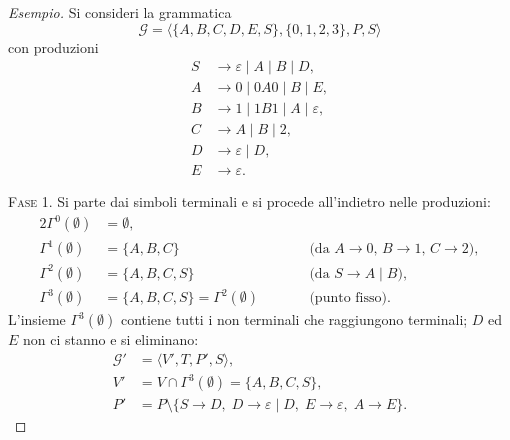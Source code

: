 \documentclass[a4paper, 11pt, oneside]{book}
\theoremstyle{formale}
\newenvironment{esempio}
    {\begin{proof}[\textit{Esempio}]\renewcommand{\qedsymbol}{$\diamond$}}
    {\end{proof}}
\begin{document}
    \begin{esempio}
        Si consideri la grammatica
        \begin{equation*}
            \mathcal{G} = \langle \{A, B, C, D, E, S\}, \{0, 1, 2, 3\}, P, S \rangle
        \end{equation*}
        con produzioni
        \begin{align*}
            S &\to \varepsilon \mid A \mid B \mid D, \\
            A &\to 0 \mid 0A0 \mid B \mid E, \\
            B &\to 1 \mid 1B1 \mid A \mid \varepsilon, \\
            C &\to A \mid B \mid 2, \\
            D &\to \varepsilon \mid D, \\
            E &\to \varepsilon.
        \end{align*}

        \textsc{Fase 1}. Si parte dai simboli terminali e si procede all'indietro nelle
        produzioni:
        \begin{alignat*}{2}
            \Gamma^0(\emptyset) &= \emptyset, & & \\
            \Gamma^1(\emptyset) &= \{A, B, C\}
                & \qquad & \text{(da $A \to 0$, $B \to 1$, $C \to 2$)}, \\
            \Gamma^2(\emptyset) &= \{A, B, C, S\}
                & & \text{(da $S \to A \mid B$)}, \\
            \Gamma^3(\emptyset) &= \{A, B, C, S\} = \Gamma^2(\emptyset)
                & & \text{(punto fisso)}.
        \end{alignat*}
        L'insieme $\Gamma^3(\emptyset)$ contiene tutti i non terminali che raggiungono
        terminali; $D$ ed $E$ non ci stanno e si eliminano:
        \begin{align*}
            \mathcal{G}' &= \langle V', T, P', S \rangle, \\
            V' &= V \cap \Gamma^3(\emptyset) = \{A, B, C, S\}, \\
            P' &= P \setminus \{S \to D,\; D \to \varepsilon \mid D,\;
                E \to \varepsilon,\; A \to E\}.
        \end{align*}


\end{esempio}
\end{document}
